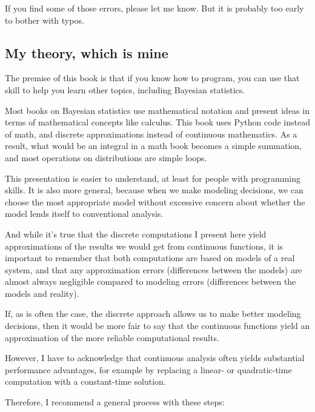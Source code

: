 \documentclass[12pt]{book}
\begin{document}
If you find some of those errors, please let me know.  But it is
probably too early to bother with typos.

\subsection*{My theory, which is mine}

The premise of this book is that if you know how to program, you
can use that skill to help you learn other topics, including
Bayesian statistics.

Most books on Bayesian statistics use mathematical notation and
present ideas in terms of mathematical concepts like calculus.
This book uses Python code instead of math, and discrete approximations
instead of continuous mathematics.  As a result, what would
be an integral in a math book becomes a simple summation, and
most operations on distributions are simple loops.

This presentation is easier to understand, at least for people with
programming skills.  It is also more general, because when we make
modeling decisions, we can choose the most appropriate model without
excessive concern about whether the model lends itself to conventional
analysis.

And while it's true that the discrete computations I present here
yield approximations of the results we would get from continuous
functions, it is important to remember that both computations are
based on models of a real system, and that any approximation errors
(differences between the models) are almost always negligible compared
to modeling errors (differences between the models and reality).

If, as is often the case, the discrete approach allows us to make
better modeling decisions, then it would be more fair to say that
the continuous functions yield an approximation of the
more reliable computational results.

However, I have to acknowledge that continuous analysis often yields
substantial performance advantages, for example by replacing a
linear- or quadratic-time computation with a constant-time
solution.

Therefore, I recommend a general process with these steps:
\end{document}
